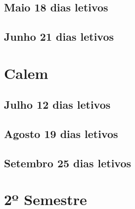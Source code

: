 \documentclass[thesis]{hmcposter}
\begin{document}
\begin{poster}
								\subsection{Maio \hfill 18 dias letivos}\subsection{Junho \hfill 21 dias letivos}\newpage
\section{\color{hmcorange}Calem}\subsection{Julho \hfill 12 dias letivos}\subsection{Agosto \hfill 19 dias letivos}\subsection{Setembro \hfill 25 dias letivos}\vfill\null
\columnbreak
\section{\hfill \color{hmcorange}2º Semestre}

\end{poster}
\end{document}
